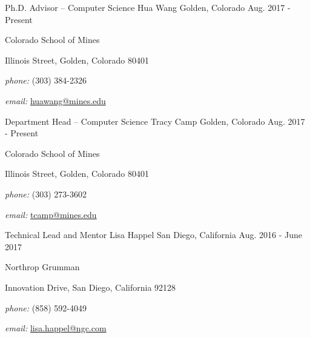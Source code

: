

\begin{cventries}

  \cventry
    {Ph.D. Advisor -- Computer Science}
    {Hua Wang}
    {Golden, Colorado}
    {Aug. 2017 - Present}
    {  
        \begin{cvitems}
        \item[] \quad Colorado School of Mines
        \item[]  Illinois Street, Golden, Colorado 80401 
        \item[] \quad \textit{phone:} (303) 384-2326 
        \item[] \quad \textit{email:} \href{mailto:huawang@mines.edu}{huawang@mines.edu}
        \end{cvitems}
    }

  \cventry
    {Department Head -- Computer Science}
    {Tracy Camp}
    {Golden, Colorado}
    {Aug. 2017 - Present}
    {
        \begin{cvitems}
        \item[] \quad Colorado School of Mines
        \item[]  Illinois Street, Golden, Colorado 80401 
        \item[] \quad \textit{phone:} (303) 273-3602 
        \item[] \quad \textit{email:} \href{mailto:tcamp@mines.edu}{tcamp@mines.edu}
        \end{cvitems}
    } 

  \cventry
    {Technical Lead and Mentor}
    {Lisa Happel}
    {San Diego, California}
    {Aug. 2016 - June 2017}
    {
        \begin{cvitems}
        \item[] \quad Northrop Grumman
        \item[]  Innovation Drive, San Diego, California 92128 
        \item[] \quad \textit{phone:} (858) 592-4049
        \item[] \quad \textit{email:} \href{mailto:lisa.happel@ngc.com}{lisa.happel@ngc.com}
        \end{cvitems}
    }


\end{cventries}
